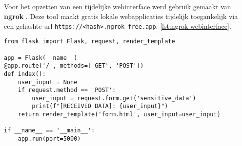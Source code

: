 
\subsection{}
\label{subsubsec:ngrok-webinterface}

Voor het opzetten van een tijdelijke webinterface werd gebruik gemaakt van \textbf{ngrok} \autocite{Ngrok2025Flask}.
Deze tool maakt gratis lokale webapplicaties tijdelijk toegankelijk via een gehashte \gls{url} \texttt{https://<hash>.ngrok-free.app}.
\ref{lst:ngrok-webinterface}.

\begin{lstlisting}[style=custompython, label={lst:ngrok-webinterface}, caption={Ngrok configuratie voor Flask webinterface}, captionpos=b]
from flask import Flask, request, render_template

app = Flask(__name__)
@app.route('/', methods=['GET', 'POST'])
def index():
    user_input = None
    if request.method == 'POST':
        user_input = request.form.get('sensitive_data')
        print(f"[RECEIVED DATA]: {user_input}")
    return render_template('form.html', user_input=user_input)

if __name__ == '__main__':
    app.run(port=5000)
\end{lstlisting}

\subsection{}
\label{subsubsec:dataset-categorisering}

